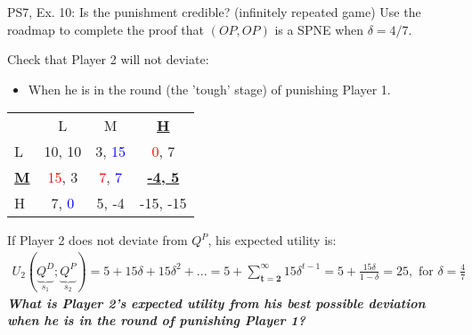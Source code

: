 \begin{frame}{PS7, Ex. 10: Is the punishment credible? (infinitely repeated game)}
    Use the roadmap to complete the proof that $(OP,OP)$ is a SPNE when $\delta=4/7$.\vspace{-4pt}
    \begin{multicols}{2}
      Check that Player 2 will not deviate:
      \begin{itemize}
        \item[4.] When he is in the  round (the 'tough' stage) of punishing Player 1.
      \end{itemize}
      \vfill\null\columnbreak
      \vspace{-6pt}
      \begin{table}
        \begin{tabular}{l|c|c|c|}
          \multicolumn{1}{c}{} & \multicolumn{1}{c}{L} & \multicolumn{1}{c}{M} & \multicolumn{1}{c}{\textbf{\underline{H}}} \\\cline{2-4}
          L & 10, 10 & 3, \textcolor{blue}{15} & \textcolor{red}{0}, 7 \\\cline{2-4}
          \textbf{\underline{M}} & \textcolor{red}{15}, 3 & \textcolor{red}{7}, \textcolor{blue}{7} & \textbf{\underline{-4, 5}} \\\cline{2-4}
          H & 7, \textcolor{blue}{0} & 5, -4 & -15, -15 \\\cline{2-4}
        \end{tabular}
      \end{table}
    \end{multicols}
    \vspace{-20pt}
    If Player 2 does not deviate from $Q^P$, his expected utility is:
    \vspace{-6pt}
    \begin{align*}
      U_2(\underbrace{Q^D}_{s_1};\underbrace{Q^P}_{s_2})=5+15\delta+15\delta^2+...
                  =5+\sum_{\bm{t=2}}^\infty15\delta^{t-1}
                  =5+\frac{15\delta}{1-\delta}
                  =25,\text{ for }\delta=\frac{4}{7}
    \end{align*}
    \textbf{\textit{What is Player 2's expected utility from his best possible deviation when he is in the  round of punishing Player 1?}}
    \vfill\null
\end{frame}
